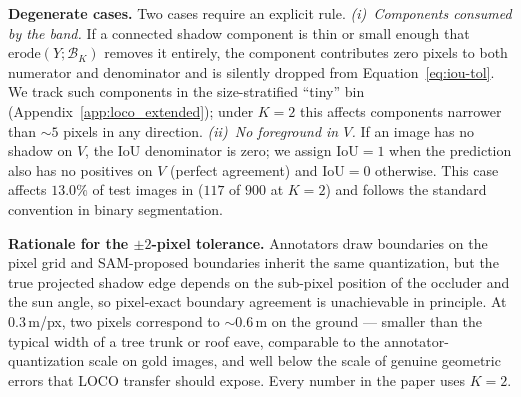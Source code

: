 \textbf{Degenerate cases.}
Two cases require an explicit rule. \emph{(i)~Components consumed by the
band.} If a connected shadow component is thin or small enough that
$\text{erode}(Y; \mathcal{B}_K)$ removes it entirely, the component
contributes zero pixels to both numerator and denominator and is silently
dropped from Equation~\ref{eq:iou-tol}. We track such components in the
size-stratified ``tiny'' bin (Appendix~\ref{app:loco_extended}); under
$K = 2$ this affects components narrower than $\sim\!5$ pixels in any
direction. \emph{(ii)~No foreground in $V$.} If an image has no shadow on
$V$, the IoU denominator is zero; we assign $\text{IoU} = 1$ when the
prediction also has no positives on $V$ (perfect agreement) and
$\text{IoU} = 0$ otherwise. This case affects $13.0\%$ of test images
in \shadow{} ($117$ of $900$ at $K = 2$) and follows the standard convention in binary segmentation.

\textbf{Rationale for the $\pm 2$-pixel tolerance.}
Annotators draw boundaries on the pixel grid and SAM-proposed boundaries
inherit the same quantization, but the true projected shadow edge depends
on the sub-pixel position of the occluder and the sun angle, so pixel-exact
boundary agreement is unachievable in principle. At $0.3$\,m/px, two pixels
correspond to $\sim\!0.6$\,m on the ground --- smaller than the typical
width of a tree trunk or roof eave, comparable to the annotator-quantization
scale on gold images, and well below the scale of genuine geometric errors
that LOCO transfer should expose. Every number in the paper uses $K = 2$.
